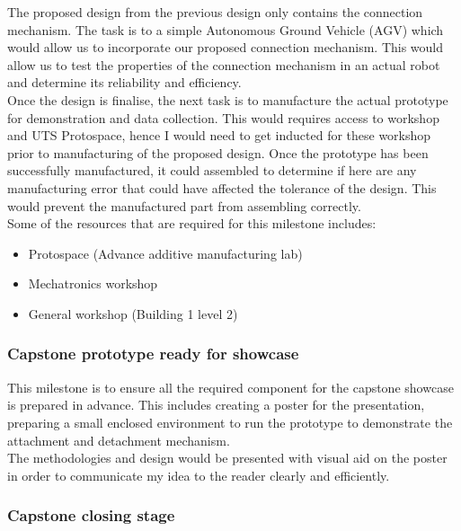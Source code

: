 \documentclass[12pt,A4]{article}
\begin{document}
	The proposed design from the previous design only contains the connection mechanism. The task is to a simple Autonomous Ground Vehicle (AGV) which would allow us to incorporate our proposed connection mechanism. This would allow us to test the properties of the connection mechanism in an actual robot and determine its reliability and efficiency. \\
	
	Once the design is finalise, the next task is to manufacture the actual prototype for demonstration and data collection. This would requires access to workshop and UTS Protospace, hence I would need to get inducted for these workshop prior to manufacturing of the proposed design. Once the prototype has been successfully manufactured, it could assembled to determine if here are any manufacturing error that could have affected the tolerance of the design. This would prevent the manufactured part from assembling correctly.\\

	Some of the resources that are required for this milestone includes:
	\begin{itemize}
		\item Protospace (Advance additive manufacturing lab)
		\item Mechatronics workshop
		\item General workshop (Building 1 level 2)
	\end{itemize}
	
	\subsubsection{Capstone prototype ready for showcase}
	
	This milestone is to ensure all the required component for the capstone showcase is prepared in advance. This includes creating a poster for the presentation, preparing a small enclosed environment to run the prototype to demonstrate the attachment and detachment mechanism.\\
	
	The methodologies and design would be presented with visual aid on the poster in order to communicate my idea to the reader clearly and efficiently.\\
	
	\subsubsection{Capstone closing stage}
	
\end{document}

